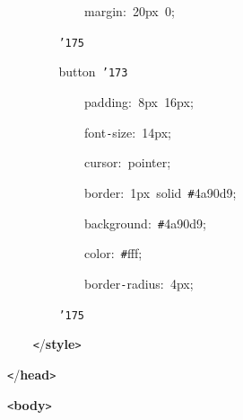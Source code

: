 \documentclass[a4paper,10pt]{article}
\def\mc{\relax}
\begin{document}
\noindent
\mbox{}{\tt\mc \ }{\tt\mc \ }{\tt\mc \ }{\tt\mc \ }{\tt\mc \ }{\tt\mc \ }{\tt\mc \ }{\tt\mc \ }{\tt\mc \ }{\tt\mc \ }{\tt\mc \ }{\tt\mc \ }margin:{\tt\mc \ }20px{\tt\mc \ }0;

\noindent
\mbox{}{\tt\mc \ }{\tt\mc \ }{\tt\mc \ }{\tt\mc \ }{\tt\mc \ }{\tt\mc \ }{\tt\mc \ }{\tt\mc \ }{\tt\char'175}

\noindent
\mbox{}{\tt\mc \ }{\tt\mc \ }{\tt\mc \ }{\tt\mc \ }{\tt\mc \ }{\tt\mc \ }{\tt\mc \ }{\tt\mc \ }button{\tt\mc \ }{\tt\char'173}

\noindent
\mbox{}{\tt\mc \ }{\tt\mc \ }{\tt\mc \ }{\tt\mc \ }{\tt\mc \ }{\tt\mc \ }{\tt\mc \ }{\tt\mc \ }{\tt\mc \ }{\tt\mc \ }{\tt\mc \ }{\tt\mc \ }padding:{\tt\mc \ }8px{\tt\mc \ }16px;

\noindent
\mbox{}{\tt\mc \ }{\tt\mc \ }{\tt\mc \ }{\tt\mc \ }{\tt\mc \ }{\tt\mc \ }{\tt\mc \ }{\tt\mc \ }{\tt\mc \ }{\tt\mc \ }{\tt\mc \ }{\tt\mc \ }font{\tt -}size:{\tt\mc \ }14px;

\noindent
\mbox{}{\tt\mc \ }{\tt\mc \ }{\tt\mc \ }{\tt\mc \ }{\tt\mc \ }{\tt\mc \ }{\tt\mc \ }{\tt\mc \ }{\tt\mc \ }{\tt\mc \ }{\tt\mc \ }{\tt\mc \ }cursor:{\tt\mc \ }pointer;

\noindent
\mbox{}{\tt\mc \ }{\tt\mc \ }{\tt\mc \ }{\tt\mc \ }{\tt\mc \ }{\tt\mc \ }{\tt\mc \ }{\tt\mc \ }{\tt\mc \ }{\tt\mc \ }{\tt\mc \ }{\tt\mc \ }border:{\tt\mc \ }1px{\tt\mc \ }solid{\tt\mc \ }{\tt\#}4a90d9;

\noindent
\mbox{}{\tt\mc \ }{\tt\mc \ }{\tt\mc \ }{\tt\mc \ }{\tt\mc \ }{\tt\mc \ }{\tt\mc \ }{\tt\mc \ }{\tt\mc \ }{\tt\mc \ }{\tt\mc \ }{\tt\mc \ }background:{\tt\mc \ }{\tt\#}4a90d9;

\noindent
\mbox{}{\tt\mc \ }{\tt\mc \ }{\tt\mc \ }{\tt\mc \ }{\tt\mc \ }{\tt\mc \ }{\tt\mc \ }{\tt\mc \ }{\tt\mc \ }{\tt\mc \ }{\tt\mc \ }{\tt\mc \ }color:{\tt\mc \ }{\tt\#}fff;

\noindent
\mbox{}{\tt\mc \ }{\tt\mc \ }{\tt\mc \ }{\tt\mc \ }{\tt\mc \ }{\tt\mc \ }{\tt\mc \ }{\tt\mc \ }{\tt\mc \ }{\tt\mc \ }{\tt\mc \ }{\tt\mc \ }border{\tt -}radius:{\tt\mc \ }4px;

\noindent
\mbox{}{\tt\mc \ }{\tt\mc \ }{\tt\mc \ }{\tt\mc \ }{\tt\mc \ }{\tt\mc \ }{\tt\mc \ }{\tt\mc \ }{\tt\char'175}

\noindent
\mbox{}{\tt\mc \ }{\tt\mc \ }{\tt\mc \ }{\tt\mc \ }{\tt <}/\textbf{style}{\tt >}

\noindent
\mbox{}{\tt <}/\textbf{head}{\tt >}

\noindent
\mbox{}{\tt <}\textbf{body}{\tt >}
\end{document}
